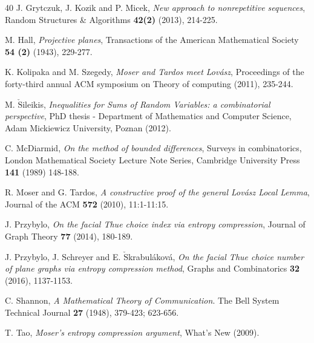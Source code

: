 \documentclass[11pt]{amsart}
\numberwithin{equation}{section}
\begin{document}
\begin{thebibliography}{40}
  J. Grytczuk, J. Kozik and P. Micek, \textit{New approach to nonrepetitive sequences}, Random Structures \& Algorithms \textbf{42(2)} (2013),  214-225.

 M. Hall, \textit{Projective planes}, Transactions of the American Mathematical Society \textbf{54 (2)} (1943), 229-277.


 K. Kolipaka and M. Szegedy, \textit{Moser and Tardos meet Lov\'asz}, Proceedings of the forty-third annual ACM symposium on Theory of computing (2011), 235-244.	

 M. $\mathrm{\check{S}}$ileikis, \textit{Inequalities for Sums of Random Variables: a combinatorial perspective}, PhD thesis - Department of Mathematics and Computer Science, Adam Mickiewicz University, Poznan (2012).

  C. McDiarmid, \textit{On the method of bounded differences}, Surveys in combinatorics, London Mathematical Society Lecture Note Series, Cambridge University Press \textbf{141} (1989) 148-188.

 R. Moser and G. Tardos,  \textit{A constructive proof of the general Lov\'asz Local Lemma}, Journal of the ACM \textbf{572 }(2010), 11:1-11:15.  


 J. Przybylo, \textit{On the facial Thue choice index via entropy compression}, Journal of Graph Theory \textbf{77} (2014), 180-189.

 J. Przybylo, J. Schreyer and E. $\mathrm{\check{S}}$krabul\textquotesingle\'{a}kov\'{a}, \textit{On the facial Thue choice number of plane graphs via entropy compression method}, Graphs and Combinatorics \textbf{32} (2016), 1137-1153.

 C. Shannon, \textit{A Mathematical Theory of Communication}. The Bell System Technical Journal \textbf{27} (1948), 379-423; 623-656.  

 T. Tao, \textit{Moser's entropy compression argument}, What's New (2009).







\end{thebibliography}
\end{document}
